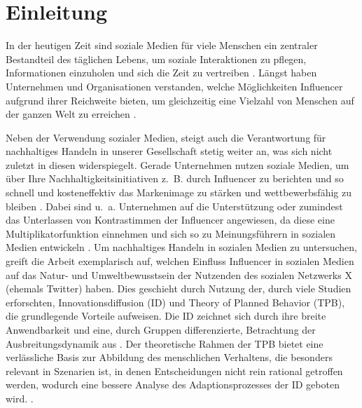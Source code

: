\documentclass[runningheads]{llncs}
\begin{document}
\section{Einleitung}

In der heutigen Zeit sind soziale Medien für viele Menschen ein zentraler Bestandteil des täglichen Lebens, um soziale Interaktionen zu pflegen, Informationen einzuholen und sich die Zeit zu vertreiben \cite{whiting_why_2013}. 
Längst haben Unternehmen und Organisationen verstanden, welche Möglichkeiten Influencer aufgrund ihrer Reichweite bieten, um gleichzeitig eine Vielzahl von Menschen auf der ganzen Welt zu erreichen \cite{statista_market_insights_influencer-werbung_2024}. 

Neben der Verwendung sozialer Medien, steigt auch die Verantwortung für nachhaltiges Handeln in unserer Gesellschaft stetig weiter an, was sich nicht zuletzt in diesen widerspiegelt. 
Gerade Unternehmen nutzen soziale Medien, um über Ihre Nachhaltigkeitsinitiativen z. B. durch Influencer zu berichten und so schnell und kosteneffektiv das Markenimage zu stärken und wettbewerbsfähig zu bleiben \cite{jha_social_2022}. 
Dabei sind u. a. Unternehmen auf die Unterstützung oder zumindest das Unterlassen von Kontrastimmen der Influencer angewiesen, da diese eine Multiplikatorfunktion einnehmen und sich so zu Meinungsführern in sozialen Medien entwickeln \cite{deges_definition_nodate}. 
Um nachhaltiges Handeln in sozialen Medien zu untersuchen, greift die Arbeit exemplarisch auf, welchen Einfluss Influencer in sozialen Medien auf das Natur- und Umweltbewusstsein der Nutzenden des sozialen Netzwerks X (ehemals Twitter) haben.
Dies geschieht durch Nutzung der, durch viele Studien erforschten, Innovationsdiffusion (ID) und Theory of Planned Behavior (TPB), die grundlegende Vorteile aufweisen.
Die ID zeichnet sich durch ihre breite Anwendbarkeit und eine, durch Gruppen differenzierte, Betrachtung der Ausbreitungsdynamik aus \cite{potthoff_diffusion_2016}.
Der theoretische Rahmen der TPB bietet eine verlässliche Basis zur Abbildung des menschlichen Verhaltens, die besonders relevant in Szenarien ist, in denen Entscheidungen nicht rein rational getroffen werden, wodurch eine bessere Analyse des Adaptionsprozesses der ID geboten wird. \cite{sadou_better_2022}. 
\end{document}
